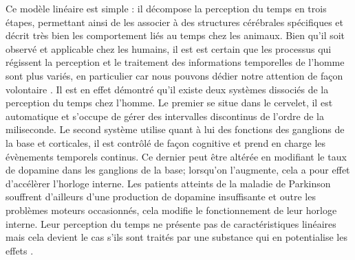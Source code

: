 \documentclass[12pt,fleqn,oneside,french,openany]{book} %
\begin{document}
Ce modèle linéaire est simple : il décompose la perception du temps en trois étapes, permettant ainsi de les associer à des structures cérébrales spécifiques et décrit très bien les comportement liés au temps chez les animaux. Bien qu'il soit observé et applicable chez les humains, il est est certain que les processus qui régissent la perception et le traitement des informations temporelles de l'homme sont plus variés, en particulier car nous pouvons dédier notre attention de façon volontaire \cite{set}. Il est en effet démontré qu'il existe deux systèmes dissociés de la perception du temps chez l'homme. Le premier se situe dans le cervelet, il est automatique et s'occupe de gérer des intervalles discontinus de l'ordre de la miliseconde. Le second système utilise quant à lui des fonctions des ganglions de la base et corticales, il est contrôlé de façon cognitive et prend en charge les évènements temporels continus. Ce dernier peut être altérée en modifiant le taux de dopamine dans les ganglions de la base; lorsqu'on l'augmente, cela a pour effet d'accélèrer l'horloge interne. Les patients atteints de la maladie de Parkinson souffrent d'ailleurs d'une production de dopamine insuffisante et outre les problèmes moteurs occasionnés, cela modifie le fonctionnement de leur horloge interne. Leur perception du temps ne présente pas de caractéristiques linéaires mais cela devient le cas s'ils sont traités par une substance qui en potentialise les effets \cite{buhusi2005}. 	





\end{document}
